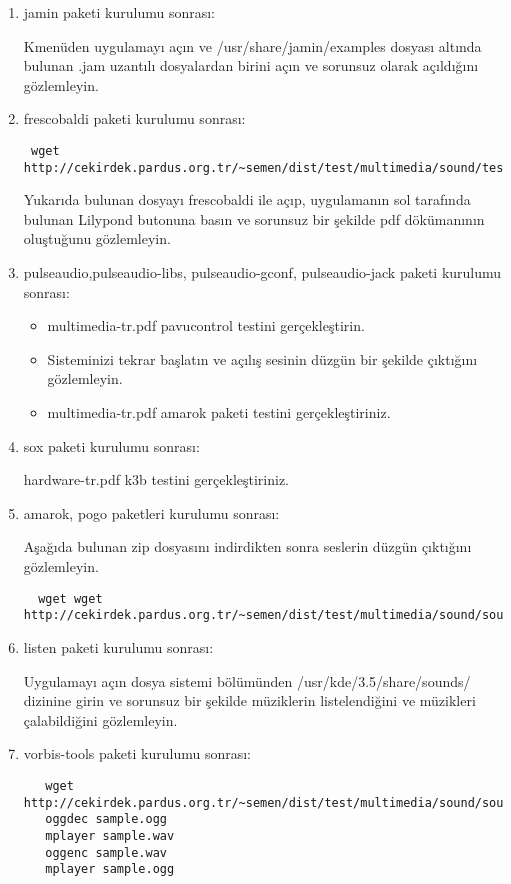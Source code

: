 \documentclass[a4paper,10pt]{article}
\begin{document}
\begin{enumerate}
\item jamin paketi kurulumu sonrası:

Kmenüden uygulamayı açın ve /usr/share/jamin/examples dosyası altında bulunan .jam uzantılı dosyalardan birini açın ve sorunsuz olarak açıldığını gözlemleyin.
\item frescobaldi paketi kurulumu sonrası:
 \begin{verbatim}
 wget http://cekirdek.pardus.org.tr/~semen/dist/test/multimedia/sound/test_frescobaldi.ly
 \end{verbatim}
Yukarıda bulunan dosyayı frescobaldi ile açıp, uygulamanın sol tarafında bulunan Lilypond butonuna basın ve sorunsuz bir şekilde pdf dökümanının oluştuğunu gözlemleyin.
\item pulseaudio,pulseaudio-libs, pulseaudio-gconf, pulseaudio-jack paketi kurulumu sonrası:
\begin{itemize}
 \item multimedia-tr.pdf pavucontrol testini gerçekleştirin.
 \item Sisteminizi tekrar başlatın ve açılış sesinin düzgün bir şekilde çıktığını gözlemleyin. 
 \item multimedia-tr.pdf amarok paketi testini gerçekleştiriniz.
\end{itemize}
\item sox paketi kurulumu sonrası:

hardware-tr.pdf k3b testini gerçekleştiriniz.
\item amarok, pogo paketleri kurulumu sonrası:
 
Aşağıda bulunan zip dosyasını indirdikten sonra seslerin düzgün çıktığını gözlemleyin.
 \begin{verbatim}
  wget wget http://cekirdek.pardus.org.tr/~semen/dist/test/multimedia/sound/sound.tar
 \end{verbatim}	

\item listen paketi kurulumu sonrası: 

Uygulamayı açın dosya sistemi bölümünden /usr/kde/3.5/share/sounds/ dizinine girin ve sorunsuz bir şekilde müziklerin listelendiğini ve müzikleri çalabildiğini gözlemleyin.

\item vorbis-tools paketi kurulumu sonrası: 
 \begin{verbatim}
   wget http://cekirdek.pardus.org.tr/~semen/dist/test/multimedia/sound/sound/sample.ogg
   oggdec sample.ogg
   mplayer sample.wav
   oggenc sample.wav
   mplayer sample.ogg
 \end{verbatim}


\end{enumerate}
\end{document}
